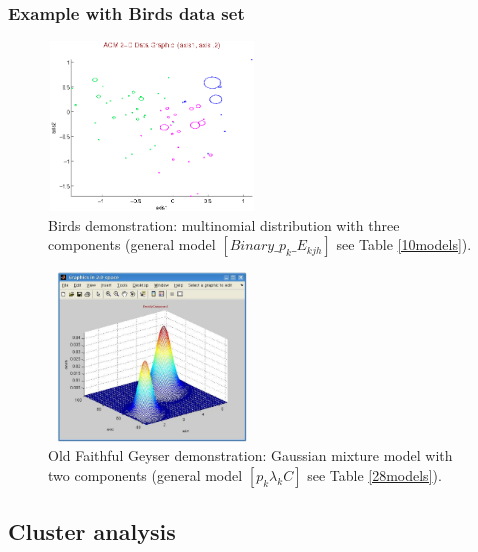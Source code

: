 \subsubsection{Example with Birds data set}
\begin{figure}[!hb]
  \centering
  \includegraphics[width=5.5cm, height=4.5cm]{birds.eps}
  \caption{Birds demonstration: multinomial distribution with three components (general model $[Binary\_{p_k}\_{E_{kjh}}]$ see Table \ref{10models}).}
\end{figure}


\begin{figure}[!h]
  \centering
  \includegraphics[width=5.5cm, height=4.5cm]{geyser1.eps}
  \caption{Old Faithful Geyser demonstration: Gaussian mixture model with two components (general model $[p_k\lambda_kC]$ see Table \ref{28models}).}
  \label{geyserFig1}
\end{figure}

\subsection{Cluster analysis}

